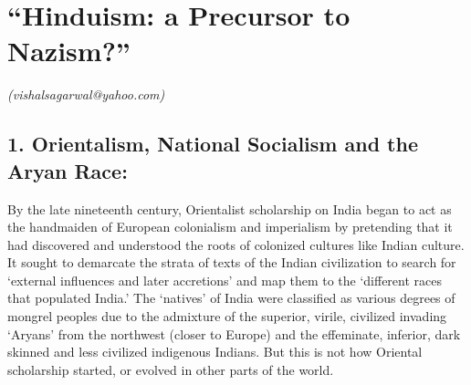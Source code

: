 
\chapter{“Hinduism: a Precursor to Nazism?”}\label{chapter8}



\begin{flushright}
\textit{(vishalsagarwal@yahoo.com)}
\end{flushright}

\setcounter{endnote}{0}

\section*{1. Orientalism, National Socialism and the Aryan Race:}

By the late nineteenth century, Orientalist scholarship on India began to act as the handmaiden of European colonialism and imperialism by pretending that it had discovered and understood the roots of colonized cultures like Indian culture. It sought to demarcate the strata of texts of the Indian civilization to search for ‘external influences and later accretions’ and map them to the ‘different races that populated India.’ The ‘natives’ of India were classified as various degrees of mongrel peoples due to the admixture of the superior, virile, civilized invading ‘Aryans’ from the northwest (closer to Europe) and the effeminate, inferior, dark skinned and less civilized indigenous Indians. But this is not how Oriental scholarship started, or evolved in other parts of the world.

